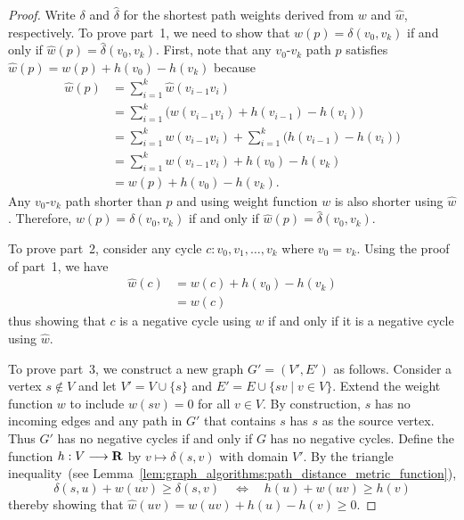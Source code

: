 \begin{proof}
Write $\delta$ and $\hat{\delta}$ for the shortest path weights
derived from $w$ and $\hat{w}$, respectively. To prove part~1, we need
to show that $w(p) = \delta(v_0, v_k)$ if and only if
$\hat{w}(p) = \hat{\delta}(v_0, v_k)$. First, note that any
$v_0$-$v_k$ path $p$ satisfies $\hat{w}(p) = w(p) + h(v_0) - h(v_k)$
because
\begin{align*}
\hat{w}(p)
&=
\sum_{i=1}^k \hat{w}(v_{i-1} v_i) \\
&=
\sum_{i=1}^k \big(w(v_{i-1} v_i) + h(v_{i-1}) - h(v_i)\big) \\
&=
\sum_{i=1}^k w(v_{i-1} v_i)
+
\sum_{i=1}^k \big(h(v_{i-1}) - h(v_i)\big) \\
&=
\sum_{i=1}^k w(v_{i-1} v_i) + h(v_0) - h(v_k) \\
&=
w(p) + h(v_0) - h(v_k).
\end{align*}
Any $v_0$-$v_k$ path shorter than $p$ and using weight function $w$ is
also shorter using $\hat{w}$. Therefore, $w(p) = \delta(v_0, v_k)$ if
and only if $\hat{w}(p) = \hat{\delta}(v_0, v_k)$.

To prove part~2, consider any cycle
$c: v_0, v_1, \dots, v_k$ where $v_0 = v_k$. Using the proof of
part~1, we have
\begin{align*}
\hat{w}(c)
&=
w(c) + h(v_0) - h(v_k) \\
&=
w(c)
\end{align*}
thus showing that $c$ is a negative cycle using $w$ if and only if it
is a negative cycle using $\hat{w}$.

To prove part~3, we construct a new graph $G' = (V', E')$ as
follows. Consider a vertex $s \notin V$ and let $V' = V \cup \{s\}$
and $E' = E \cup \{sv \mid v \in V\}$. Extend the weight function $w$
to include $w(sv) = 0$ for all $v \in V$. By construction, $s$ has no
incoming edges and any path in $G'$ that contains $s$ has $s$ as the
source vertex. Thus $G'$ has no
negative cycles if and only if $G$ has no
negative cycles. Define the function $h: V \longrightarrow \mathbf{R}$ by
$v \mapsto \delta(s,v)$ with domain $V'$. By the triangle
inequality~(see
Lemma~\ref{lem:graph_algorithms:path_distance_metric_function}),
\[
\delta(s,u) + w(uv) \geq \delta(s,v)
\quad
\iff
\quad
h(u) + w(uv) \geq h(v)
\]
thereby showing that $\hat{w}(uv) = w(uv) + h(u) - h(v) \geq 0$.
\end{proof}



